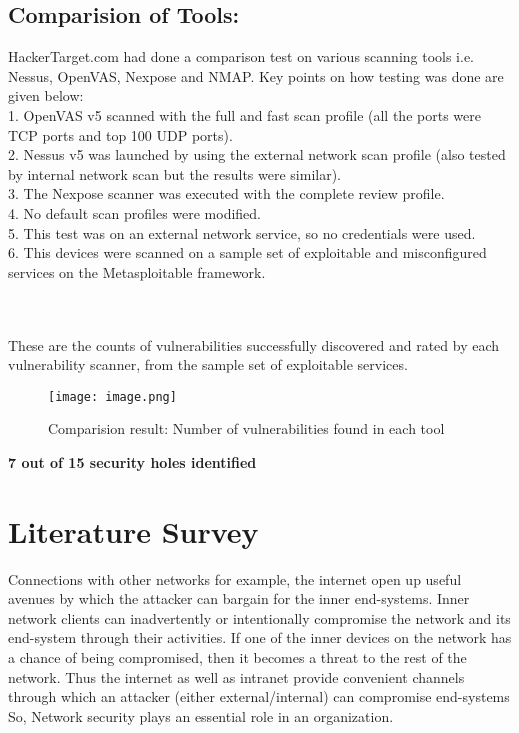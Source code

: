\documentclass[conference]{IEEEtran}
\begin{document}
\subsection{Comparision of Tools:}
HackerTarget.com had done a comparison test on various scanning tools i.e. Nessus, OpenVAS, Nexpose and NMAP. Key points on how testing was done are given below:
\\1. OpenVAS v5 scanned with the full and fast scan profile (all the ports were TCP ports and top 100 UDP ports).
\\2. Nessus v5 was launched by using the external network scan profile (also tested by internal network scan but the results were similar).
\\3. The Nexpose scanner was executed with the complete review profile.
\\4. No default scan profiles were modified.
\\5. This test was on an external network service, so no credentials were used.
\\6. This devices were scanned on a sample set of exploitable and misconfigured services on the Metasploitable framework.

\\   
\\These are the counts of vulnerabilities successfully discovered and rated by each vulnerability scanner, from the sample set of exploitable services.

\begin{figure}[h]
    \centering
    \texttt{[image: image.png]}
    \caption{Comparision result: Number of vulnerabilities found in each tool}
\end{figure}

\textbf{7 out of 15 security holes identified}

\section{Literature Survey}
Connections with other networks for example, the internet open up useful avenues by which the attacker can bargain for the inner end-systems. Inner network clients can inadvertently or intentionally compromise the network and its end-system through their activities. If one of the inner devices on the network has a chance of being compromised, then it becomes a threat to the rest of the network. Thus the internet as well as intranet provide convenient channels through which an attacker (either external/internal) can compromise end-systems So, Network security plays an essential role in an organization.
\end{document}
